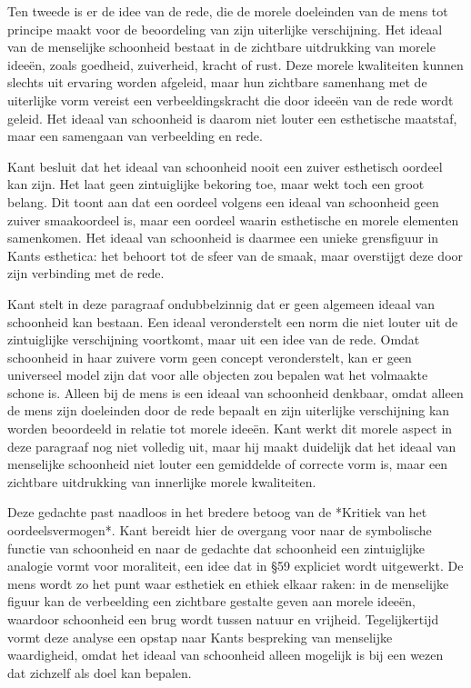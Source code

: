 \begin{mdframed}[leftmargin=0pt,rightmargin=0pt,backgroundcolor=blue!6,linecolor=white,innertopmargin=6pt,innerbottommargin=6pt]
Ten tweede is er de idee van de rede, die de morele doeleinden van de mens tot principe maakt voor de beoordeling van zijn uiterlijke verschijning. Het ideaal van de menselijke schoonheid bestaat in de zichtbare uitdrukking van morele ideeën, zoals goedheid, zuiverheid, kracht of rust. Deze morele kwaliteiten kunnen slechts uit ervaring worden afgeleid, maar hun zichtbare samenhang met de uiterlijke vorm vereist een verbeeldingskracht die door ideeën van de rede wordt geleid. Het ideaal van schoonheid is daarom niet louter een esthetische maatstaf, maar een samengaan van verbeelding en rede.

Kant besluit dat het ideaal van schoonheid nooit een zuiver esthetisch oordeel kan zijn. Het laat geen zintuiglijke bekoring toe, maar wekt toch een groot belang. Dit toont aan dat een oordeel volgens een ideaal van schoonheid geen zuiver smaakoordeel is, maar een oordeel waarin esthetische en morele elementen samenkomen. Het ideaal van schoonheid is daarmee een unieke grensfiguur in Kants esthetica: het behoort tot de sfeer van de smaak, maar overstijgt deze door zijn verbinding met de rede.

\bigskip
Kant stelt in deze paragraaf ondubbelzinnig dat er geen algemeen ideaal van schoonheid kan bestaan. Een ideaal veronderstelt een norm die niet louter uit de zintuiglijke verschijning voortkomt, maar uit een idee van de rede. Omdat schoonheid in haar zuivere vorm geen concept veronderstelt, kan er geen universeel model zijn dat voor alle objecten zou bepalen wat het volmaakte schone is. Alleen bij de mens is een ideaal van schoonheid denkbaar, omdat alleen de mens zijn doeleinden door de rede bepaalt en zijn uiterlijke verschijning kan worden beoordeeld in relatie tot morele ideeën. Kant werkt dit morele aspect in deze paragraaf nog niet volledig uit, maar hij maakt duidelijk dat het ideaal van menselijke schoonheid niet louter een gemiddelde of correcte vorm is, maar een zichtbare uitdrukking van innerlijke morele kwaliteiten.

Deze gedachte past naadloos in het bredere betoog van de *Kritiek van het oordeelsvermogen*. Kant bereidt hier de overgang voor naar de symbolische functie van schoonheid en naar de gedachte dat schoonheid een zintuiglijke analogie vormt voor moraliteit, een idee dat in §59 expliciet wordt uitgewerkt. De mens wordt zo het punt waar esthetiek en ethiek elkaar raken: in de menselijke figuur kan de verbeelding een zichtbare gestalte geven aan morele ideeën, waardoor schoonheid een brug wordt tussen natuur en vrijheid. Tegelijkertijd vormt deze analyse een opstap naar Kants bespreking van menselijke waardigheid, omdat het ideaal van schoonheid alleen mogelijk is bij een wezen dat zichzelf als doel kan bepalen.


\end{mdframed}
